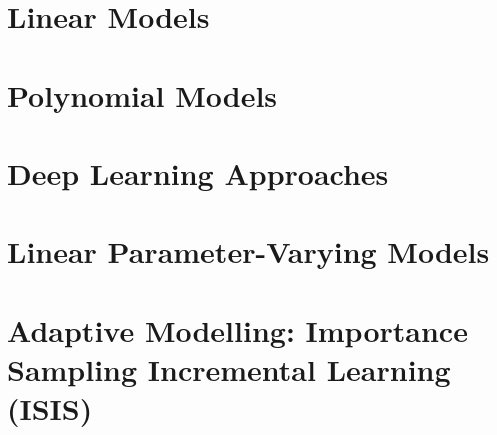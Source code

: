 \section{Linear Models}

\section{Polynomial Models}

\section{Deep Learning Approaches}

\section{Linear Parameter-Varying Models}

\section{Adaptive Modelling: Importance Sampling Incremental Learning (ISIS)}
